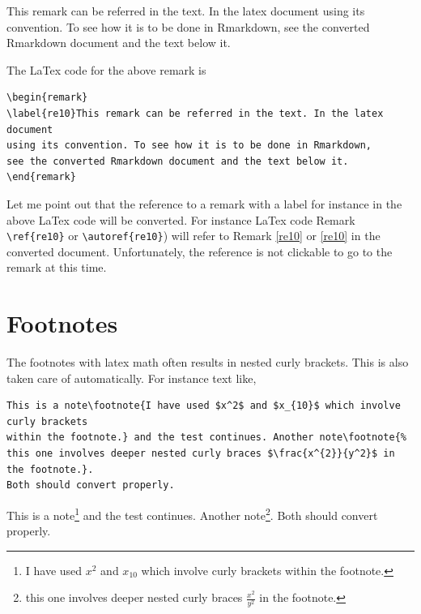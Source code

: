 \documentclass[12pt,svgnames]{article}
\begin{document}
\begin{remark}
\label{re10}This remark can be referred in the text. In the latex document using its convention. 
To see how it is to be done in Rmarkdown, see the converted Rmarkdown document and the text below it.
\end{remark}

The LaTex code for the above remark is
\begin{verbatim}
\begin{remark}
\label{re10}This remark can be referred in the text. In the latex document 
using its convention. To see how it is to be done in Rmarkdown, 
see the converted Rmarkdown document and the text below it.
\end{remark}
\end{verbatim}
Let me point out that the reference to a remark with a label for instance in the above LaTex code will be converted. 
For instance LaTex code Remark \verb&\ref{re10}& or \verb&\autoref{re10}&) will refer to Remark \ref{re10} or \autoref{re10} in the converted document. Unfortunately, the reference is not clickable to go to the remark at this time.

\section{Footnotes} \label{sec9}
The footnotes with latex math often results in nested curly brackets. This is also taken care of automatically.  For instance text like,

\begin{verbatim}
This is a note\footnote{I have used $x^2$ and $x_{10}$ which involve curly brackets 
within the footnote.} and the test continues. Another note\footnote{%
this one involves deeper nested curly braces $\frac{x^{2}}{y^2}$ in the footnote.}. 
Both should convert properly.
\end{verbatim}

This is a note\footnote{I have used $x^2$ and $x_{10}$ which involve curly brackets 
within the footnote.} and the test continues. Another note\footnote{%
this one involves deeper nested curly braces $\frac{x^{2}}{y^2}$ in the footnote.}. 
Both should convert properly.

\printbibliography
\end{document}
